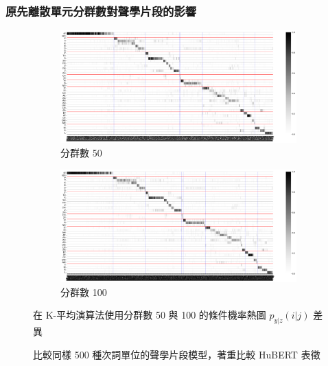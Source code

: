 {{\subsubsection{原先離散單元分群數對聲學片段的影響}


{
    {
        \begin{figure}
             \centering
             \begin{subfigure}{\textwidth}
                 \centering
                 \includegraphics[width=1\linewidth]{feasiblefigs/ch4figs/hub-u050-ap0500-givenunit-byphn.png}
                 \caption{分群數 50}
                 \label{fig:hub-u050-ap0500-givenunit-byphn--picked}
             \end{subfigure}
             \vfill
             \begin{subfigure}{\textwidth}
                 \centering
                 \includegraphics[width=1\linewidth]{feasiblefigs/ch4figs/hub-u050-ap1000-givenunit-byphn.png}
                 \caption{分群數 100}
                 \label{fig:hub-u100-ap0500-givenunit-byphn--picked}
             \end{subfigure}
             \caption{比較同樣 500 種次詞單位的聲學片段模型，著重比較 HuBERT 表徵}
             在 K-平均演算法使用分群數 50 與 100 的條件機率熱圖 $p_{y|z}(i|j)$ 差異
             \label{fig:check-ap0500}
        \end{figure}
    }
}



}}
